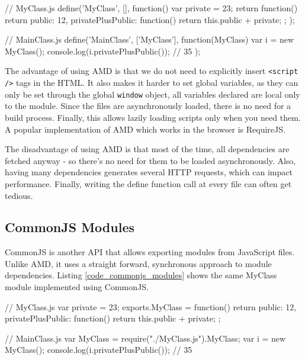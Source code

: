 \begin{code}
// MyClass.js
define('MyClass', [], function(){
  var private = 23;
  return function(){
    return {
      public: 12,
      privatePlusPublic: function(){
        return this.public + private;
      }
    }
  };
});

// MainClass.js
define('MainClass', ['MyClass'], function(MyClass){
  var i = new MyClass();
  console.log(i.privatePlusPublic()); // 35
});
\end{code}

The advantage of using AMD is that we do not need to explicitly insert \lstinline{<script />} tags in the HTML. It also makes it harder to set global variables, as they can only be set through the global \lstinline{window} object, all variables declared are local only to the module. Since the files are asynchronously loaded, there is no need for a build process. Finally, this allows lazily loading scripts only when you need them.
A popular implementation of AMD which works in the browser is RequireJS. 

The disadvantage of using AMD is that most of the time, all dependencies are fetched anyway - so there's no need for them to be loaded asynchronously. Also, having many dependencies generates several HTTP requests, which can impact performance. Finally, writing the define function call at every file can often get tedious.

\subsection{CommonJS Modules} %
\label{sub:commonjs_modules}
CommonJS is another API that allows exporting modules from JavaScript files. Unlike AMD, it uses a straight forward, synchronous approach to module dependencies. Listing \ref{code_commonjs_modules} shows the same MyClass module implemented using CommonJS.

\begin{code}
// MyClass.js
var private = 23;
exports.MyClass = function(){
  return {
    public: 12,
    privatePlusPublic: function(){
      return this.public + private;
    }
  }
};

// MainClass.js
var MyClass = require("./MyClass.js").MyClass;
var i = new MyClass();
console.log(i.privatePlusPublic()); // 35
\end{code}

